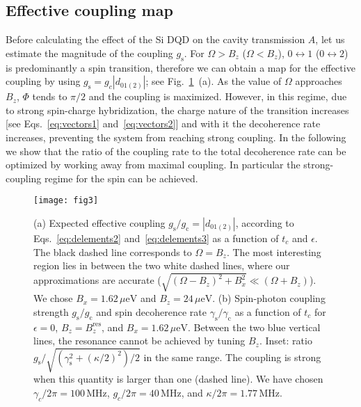 \documentclass[twocolumn,english,aps,prl,preprint,reprint,showpacs,longbibliography,showkeys]{revtex4-1}
\begin{document}
\subsection{Effective coupling map}
\label{subsec:coupling-map}

Before calculating the effect of the Si DQD on the cavity transmission $A$, let us estimate the magnitude of the coupling $g_{\mathrm{s}}$.
For $\Omega>B_z$ ($\Omega<B_z$),  $0\leftrightarrow 1$ ($0\leftrightarrow 2$) is predominantly a spin transition, 
therefore
we can obtain a map for the effective  coupling by using $g_{\mathrm{s}}=g_c|d_{01(2)}|$; see  Fig.~\ref{fig:figure3}~(a). As  the value of $\Omega$ approaches $B_z$, $\Phi$ tends to $ \pi/2$ and  the  coupling  is maximized.
However, in this regime, due to strong spin-charge hybridization, 
the charge nature of the transition increases [see Eqs.~\eqref{eq:vectors1} and~\eqref{eq:vectors2}] 
and with it the decoherence rate increases, preventing the system from 
reaching strong coupling.
In the following we show that
the ratio of the coupling rate to the total 
decoherence rate can be optimized by working away from maximal coupling. In particular the strong-coupling regime for the spin can be achieved.


\begin{figure}
\texttt{[image: fig3]}
\protect\caption{\label{fig:figure3}(a) Expected effective coupling $g_{\mathrm{s}}/g_{\mathrm{c}}=|d_{01(2)}|$, according to Eqs.~\eqref{eq:delements2} and~\eqref{eq:delements3}  as a function of $t_c$ and $\epsilon$. The black dashed line corresponds to $\Omega=B_z$.
The most interesting region lies in between the two white dashed lines, where our approximations are  accurate ($\sqrt{(\Omega-B_z)^2+B_x^2}\ll (\Omega+B_z)$).
We chose  $B_x=1.62\,\mu\mathrm{eV}$ and $B_z=24\,\mu\mathrm{eV}$. (b) Spin-photon coupling strength $g_{\mathrm{s}}/g_{\mathrm{c}}$ and spin decoherence rate $\gamma_{\mathrm{s}}/\gamma_{\mathrm{c}}$ as a function of  $t_c$ for $\epsilon=0$, $B_z=B_z^{\mathrm{res}}$, and $B_x=1.62\,\mu\mathrm{eV}$. Between the two blue vertical lines, the resonance cannot be achieved by tuning $B_z$. Inset: ratio $g_{\mathrm{s}}/\sqrt{(\gamma_{\mathrm{s}}^2+(\kappa/2)^2)/2}$ in the same range. The coupling is strong when this quantity is larger than one (dashed line). We have chosen   $\gamma_c/2\pi=100\,\mathrm{MHz}$, $g_c/2\pi=40\,\mathrm{MHz}$, and $\kappa/2\pi=1.77\,\mathrm{MHz}$.}
\end{figure}

\end{document}
